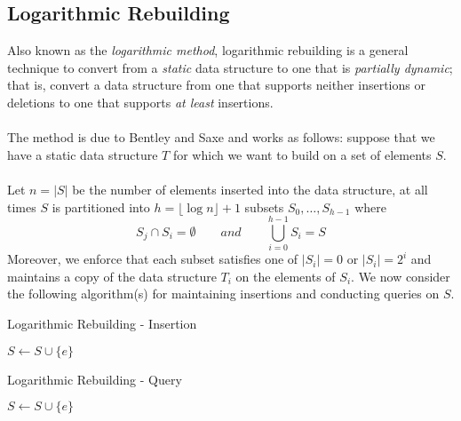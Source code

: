 \subsection*{Logarithmic Rebuilding}

Also known as the \textit{logarithmic method}, logarithmic rebuilding is a general technique to convert from a \textit{static} data structure to one that is \textit{partially dynamic}; that is, convert a data structure from one that supports neither insertions or deletions to one that supports \textit{at least} insertions. \\
\\
The method is due to Bentley and Saxe \cite{BENTLEY1980301} and works as follows: suppose that we have a static data structure $T$ for which we want to build on a set of elements $S$. \\
\\
Let $n = |S|$ be the number of elements inserted into the data structure, at all times $S$ is partitioned into $h = \lfloor \log n\rfloor+1$ subsets $S_0, \dots, S_{h-1}$ where 
$$S_j \cap S_i = \emptyset \quad \quad  and \quad \quad \bigcup_{i=0}^{h-1}S_i = S$$ 
Moreover, we enforce that each subset satisfies one of $|S_i| = 0$ or $|S_i| = 2^i$ and maintains a copy of the data structure $T_i$ on the elements of $S_i$. We now consider the following algorithm(s) for maintaining insertions and conducting queries on $S$. 

\begin{algorithm}
\caption{Logarithmic Rebuilding - Insertion}
\begin{algorithmic}
    \State $S\gets S \cup \{e\}$
\end{algorithmic}
\end{algorithm}


\begin{algorithm}
\caption{Logarithmic Rebuilding - Query}
\begin{algorithmic}
    \State $S\gets S \cup \{e\}$
\end{algorithmic}
\end{algorithm}